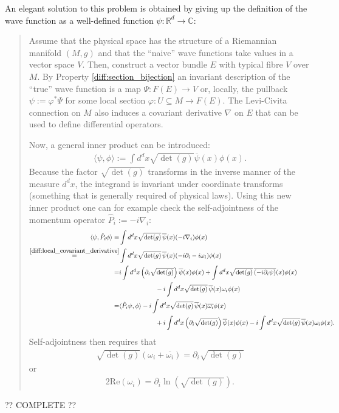     An elegant solution to this problem is obtained by giving up the definition of the wave function as a well-defined function $\psi:\mathbb{R}^d\rightarrow\mathbb{C}$:
    \begin{quote}
        Assume that the physical space has the structure of a Riemannian manifold $(M,g)$ and that the ``naive'' wave functions take values in a vector space $V$. Then, construct a vector bundle $E$ with typical fibre $V$ over $M$. By Property \ref{diff:section_bijection} an invariant description of the ``true'' wave function is a map $\Psi:F(E)\rightarrow V$ or, locally, the pullback $\psi:=\varphi^*\Psi$ for some local section $\varphi:U\subseteq M\rightarrow F(E)$. The Levi-Civita connection on $M$ also induces a covariant derivative $\nabla$ on $E$ that can be used to define differential operators.

        Now, a general inner product can be introduced:
        \begin{gather}
            \langle\psi,\phi\rangle := \int d^dx\sqrt{\det(g)}\overline{\psi}(x)\phi(x).
        \end{gather}
        Because the factor $\sqrt{\det(g)}$ transforms in the inverse manner of the measure $d^dx$, the integrand is invariant under coordinate transforms (something that is generally required of physical laws). Using this new inner product one can for example check the self-adjointness of the momentum operator $\hat{P}_i := -i\nabla_i$:
        \begin{align*}
            \langle\psi,\hat{P}_i\phi\rangle = &\int d^dx\sqrt{\det(g)}\,\overline{\psi}(x)(-i\nabla_i)\phi(x)\\
            \overset{\eqref{diff:local_covariant_derivative}}{=} &\int d^dx\sqrt{\det(g)}\,\overline{\psi}(x)(-i\partial_i - i\omega_i)\phi(x)\\
            = &i\int d^dx\left(\partial_i\sqrt{\det(g)}\right)\overline{\psi}(x)\phi(x) + \int d^dx\sqrt{\det(g)}\,\overline{(-i\partial_i\psi)}(x)\phi(x)\\
                &\hspace{2cm} -i\int d^dx\sqrt{\det(g)}\,\overline{\psi}(x)\omega_i\phi(x)\\
            = &\langle\hat{P}_i\psi,\phi\rangle -i\int d^dx\sqrt{\det(g)}\,\overline{\psi}(x)\overline{\omega_i}\phi(x)\\
                &\hspace{2cm} + i\int d^dx\left(\partial_i\sqrt{\det(g)}\right)\overline{\psi}(x)\phi(x) -i\int d^dx\sqrt{\det(g)}\,\overline{\psi}(x)\omega_i\phi(x).
        \end{align*}
        Self-adjointness then requires that
        \begin{gather}
            \sqrt{\det(g)}(\omega_i + \overline{\omega_i}) = \partial_i\sqrt{\det(g)}
        \end{gather}
        or
        \begin{gather}
            2\mathrm{Re}(\omega_i) = \partial_i\ln\left(\sqrt{\det(g)}\right).
        \end{gather}
    \end{quote}
    ?? COMPLETE ??